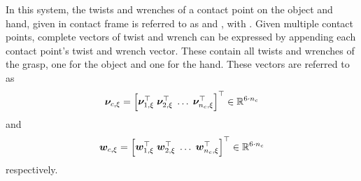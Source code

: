 In this system, the twists and wrenches of a contact point  on the object and hand, given in contact frame  is referred to as  and , with . Given multiple contact points, complete vectors of twist and wrench can be expressed by appending each contact point's twist and wrench vector. These contain all twists and wrenches of the grasp, one for the object and one for the hand. These vectors are referred to as 
%
\begin{equation}
	\vec{\nu}_{c,\xi} = \rvec{\vec{\nu}_{1,\xi}^\T \vsep \vec{\nu}_{2,\xi}^\T \vsep \ldots \vsep \vec{\nu}_{n_c,\xi}^\T}^\T \inR{6\cdot n_c}
	\label{eq:complete-twists}
\end{equation}
%
and
\begin{equation}
	\vec{w}_{c,\xi} = \rvec{\vec{w}_{1,\xi}^\T \vsep \vec{w}_{2,\xi}^\T \vsep \ldots \vsep \vec{w}_{n_c,\xi}^\T}^\T \inR{6\cdot n_c}
	\label{eq:complete-wrenches}
\end{equation}
%
respectively. \medskip

